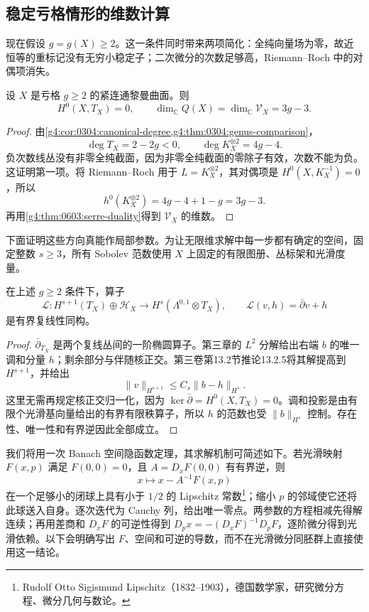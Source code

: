 \subsection{稳定亏格情形的维数计算}
\label{g4:subsec:0603:04}

现在假设 \(g=g(X)\ge2\)。这一条件同时带来两项简化：全纯向量场为零，故近恒等的重标记没有无穷小稳定子；二次微分的次数足够高，Riemann--Roch 中的对偶项消失。

\begin{corollary}\label{g4:cor:0603:dimension}
	设 \(X\) 是亏格 \(g\ge2\) 的紧连通黎曼曲面。则
	\[
		H^0(X,T_X)=0,\qquad
		\dim_{\mathbb C}Q(X)
		=\dim_{\mathbb C}\mathcal V_X=3g-3.
	\]
\end{corollary}
\begin{proof}
	由\cref{g4:cor:0304:canonical-degree,g4:thm:0304:genus-comparison}，
	\[
		\deg T_X=2-2g<0,
		\qquad \deg K_X^{\otimes2}=4g-4.
	\]
	负次数线丛没有非零全纯截面，因为非零全纯截面的零除子有效，次数不能为负。这证明第一项。将 Riemann--Roch 用于 \(L=K_X^{\otimes2}\)，其对偶项是 \(H^0(X,K_X^{-1})=0\)，所以
	\[
		h^0(K_X^{\otimes2})=4g-4+1-g=3g-3.
	\]
	再用\cref{g4:thm:0603:serre-duality}得到 \(\mathcal V_X\) 的维数。
\end{proof}

下面证明这些方向真能作局部参数。为让无限维求解中每一步都有确定的空间，固定整数 \(s\ge3\)，所有 Sobolev 范数使用 \(X\) 上固定的有限图册、丛标架和光滑度量。

\begin{lemma}\label{g4:lem:0603:split-inverse}
	在上述 \(g\ge2\) 条件下，算子
	\[
		\mathcal L:H^{s+1}(T_X)\oplus\mathscr H_X
		\longrightarrow H^s(\Lambda^{0,1}\otimes T_X),
		\qquad \mathcal L(v,h)=\bar\partial v+h
	\]
	是有界复线性同构。
\end{lemma}
\begin{proof}
	\(\bar\partial_{T_X}\) 是两个复线丛间的一阶椭圆算子。第三章的 \(L^2\) 分解给出右端 \(b\) 的唯一调和分量 \(h\)；剩余部分与伴随核正交。第三卷第13.2节推论13.2.5将其解提高到 \(H^{s+1}\)，并给出
	\[
		\|v\|_{H^{s+1}}\le C_s\|b-h\|_{H^s}.
	\]
	这里无需再规定核正交归一化，因为 \(\ker\bar\partial=H^0(X,T_X)=0\)。调和投影是由有限个光滑基向量给出的有界有限秩算子，所以 \(h\) 的范数也受 \(\|b\|_{H^s}\) 控制。存在性、唯一性和有界逆因此全部成立。
\end{proof}

我们将用一次 Banach 空间隐函数定理，其求解机制可简述如下。若光滑映射 \(F(x,p)\) 满足 \(F(0,0)=0\)，且 \(A=D_xF(0,0)\) 有有界逆，则
\[
	x\longmapsto x-A^{-1}F(x,p)
\]
在一个足够小的闭球上具有小于 \(1/2\) 的 Lipschitz 常数\footnote{Rudolf Otto Sigismund Lipschitz（1832--1903），德国数学家，研究微分方程、微分几何与数论。}；缩小 \(p\) 的邻域使它还将此球送入自身。逐次迭代为 Cauchy 列，给出唯一零点。两参数的方程相减先得解连续；再用差商和 \(D_xF\) 的可逆性得到
\(D_px=-(D_xF)^{-1}D_pF\)，逐阶微分得到光滑依赖。以下会明确写出 \(F\)、空间和可逆的导数，而不在光滑微分同胚群上直接使用这一结论。

